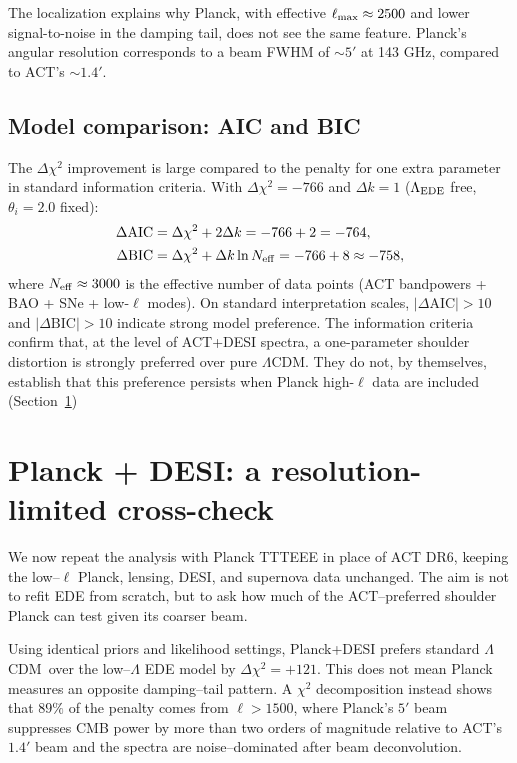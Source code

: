 \documentclass[onecolumn,showpacs,preprintnumbers,amsmath,amssymb,prd]{revtex4-2}
\newcommand{\lcdm}{$\Lambda$CDM}
\begin{document}
The localization explains why Planck, with effective $\ell_{\rm max} 
\approx 2500$ and lower signal-to-noise in the damping tail, does not see 
the same feature. Planck's angular resolution corresponds to a beam FWHM 
of $\sim 5'$ at 143 GHz, compared to ACT's $\sim 1.4'$.

\subsection{Model comparison: AIC and BIC}
\label{sec:aic_bic}

The $\Delta\chi^2$ improvement is large compared to the penalty for one 
extra parameter in standard information criteria. With $\Delta\chi^2 = -766$ 
and $\Delta k = 1$ ($\Lambda_{\rm EDE}$ free, $\theta_i = 2.0$ fixed):
\begin{align}
\Delta\text{AIC} &= \Delta\chi^2 + 2\Delta k = -766 + 2 = -764, \\
\Delta\text{BIC} &= \Delta\chi^2 + \Delta k \ln N_{\rm eff} = -766 + 8 \approx -758,
\end{align}
where $N_{\rm eff} \approx 3000$ is the effective number of data points 
(ACT bandpowers + BAO + SNe + low-$\ell$ modes). On standard interpretation 
scales, $|\Delta\text{AIC}| > 10$ and $|\Delta\text{BIC}| > 10$ indicate 
strong model preference. The information criteria confirm that, at the level 
of ACT+DESI spectra, a one-parameter shoulder distortion is strongly preferred 
over pure \lcdm. They do not, by themselves, establish that this preference 
persists when Planck high-$\ell$ data are included (Section~\ref{sec:planck})

\section{Planck + DESI: a resolution-limited cross-check}
\label{sec:planck}

We now repeat the analysis with Planck TTTEEE in place of ACT DR6, keeping the
low--$\ell$ Planck, lensing, DESI, and supernova data unchanged. The aim is not
to refit EDE from scratch, but to ask how much of the ACT--preferred shoulder
Planck can test given its coarser beam.

Using identical priors and likelihood settings, Planck+DESI prefers standard
\lcdm\ over the low--$\Lambda$ EDE model by $\Delta\chi^2 = +121$. This does
not mean Planck measures an opposite damping--tail pattern. A $\chi^2$
decomposition instead shows that $89\%$ of the penalty comes from
$\ell > 1500$, where Planck's $5'$ beam suppresses CMB power by more than two
orders of magnitude relative to ACT's $1.4'$ beam and the spectra are
noise--dominated after beam deconvolution.
\end{document}
